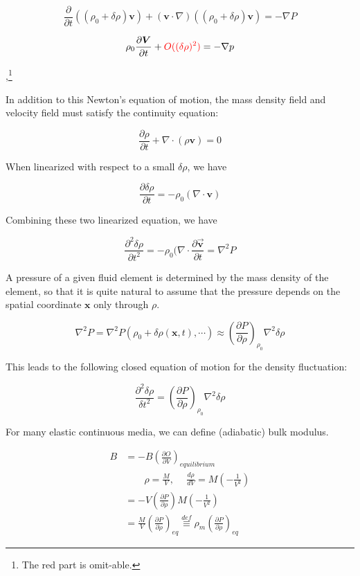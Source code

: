 ﻿\documentclass[twoside]{book}
\numberwithin{equation}{section}
\begin{document}
\[\frac{\partial}{\partial t}\left((\rho_0+\delta\rho)\bm{v}\right) + (\bm{v}\cdot\nabla)\left((\rho_0+\delta\rho)\bm{v}\right) = -\nabla P \]

\[\rho_0\frac{\partial\bm{V}}{\partial t} + {\color{red}{O((\delta\rho)^2)}}= -\nabla p \]

,\footnote{The red part is omit-able. }

In addition to this Newton's equation of motion, the mass density field and velocity field must satisfy the continuity equation: 

\[\frac{\partial \rho}{\partial t}+\nabla\cdot(\rho\bm{v}) = 0 \]

When linearized with respect to a small $\delta \rho$, we have

\[\frac{\partial\delta\rho}{\partial t} = -\rho_0(\nabla\cdot\bm{v}) \]

Combining these two linearized equation, we have

\[\frac{\partial^2\delta\rho}{\partial t^2}= -\rho_0(\nabla\cdot\frac{\partial\vec{\bm{v}}}{\partial t} = \nabla^2 P \]

A pressure of a given fluid element is determined by the mass density of the element, so that it is quite natural to assume that the pressure depends on the spatial coordinate $\bm{x}$ only through $\rho$. 

\[\nabla^2 P = \nabla^2 P(\rho_0+\delta\rho(\bm{x},t),\cdots) \approx\left(\frac{\partial P}{\partial\rho}\right)_{\rho_0}\nabla^2\delta\rho \]

This leads to the following closed equation of motion for the density fluctuation:

\[\frac{\partial^2\delta\rho}{\delta t^2} = \left(\frac{\partial P}{\partial \rho}\right)_{\rho_0}\nabla^2\delta\rho \]

For many elastic continuous media, we can define (adiabatic) bulk modulus. 

\[\begin{split}
B &= -B\left(\frac{\partial O}{\partial V}\right)_{equilibrium}\\
&\quad\quad \rho = \frac{M}{V},\ \quad \frac{d\rho}{dV} = M\left(-\frac{1}{V^2}\right)\\
&= -V\left(\frac{\partial P}{\partial\rho}\right)M\left(-\frac{1}{V^2}\right)\\ &= \frac{M}{V}\left(\frac{\partial P}{\partial \rho}\right)_{eq} \overset{def}{\equiv}\rho_m\left(\frac{\partial P}{\partial\rho}\right)_{eq}
\end{split} \]
\end{document}
